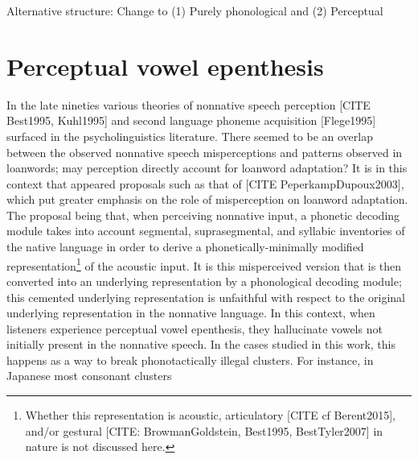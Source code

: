 {\color{red}Alternative structure: Change to (1) Purely phonological and (2) Perceptual}


\section{Perceptual vowel epenthesis}

In the late nineties various theories of nonnative speech perception [CITE Best1995, Kuhl1995] and second language phoneme acquisition [Flege1995] surfaced in the psycholinguistics literature. There seemed to be an overlap between the observed nonnative speech misperceptions and patterns observed in loanwords; may perception directly account for loanword adaptation?   
It is in this context that appeared proposals such as that of [CITE PeperkampDupoux2003], which put greater emphasis on the role of misperception on loanword adaptation. The proposal being that, when perceiving nonnative input, a phonetic decoding module takes into account segmental, suprasegmental, and syllabic inventories of the native language in order to derive a phonetically-minimally modified representation\footnote{Whether this representation is acoustic, articulatory [CITE cf Berent2015], and/or gestural [CITE: BrowmanGoldstein, Best1995, BestTyler2007] in nature is not discussed here.} of the acoustic input. It is this misperceived version that is then converted into an underlying representation by a phonological decoding module; this cemented underlying representation is unfaithful with respect to the original underlying representation in the nonnative language.  
In this context, when listeners experience perceptual vowel epenthesis, they hallucinate vowels not initially present in the nonnative speech. In the cases studied in this work, this happens as a way to break phonotactically illegal clusters. For instance, in Japanese most consonant clusters%
